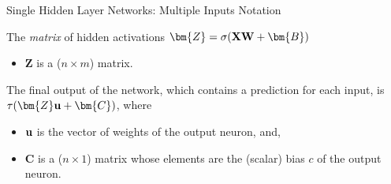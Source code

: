 \documentclass[11pt,compress,t,notes=noshow, xcolor=table]{beamer}
\begin{document}
\begin{framei}[sep=L]{Single Hidden Layer Networks: Multiple Inputs Notation}

\item The \textit{matrix} of hidden activations $\bm{Z} = \sigma(\Xmat\Wmat + \bm{B})$
    \begin{itemize}
      \item $\bm{Z}$ is a ($n \times m$) matrix.
    \end{itemize}
    
    \item The final output of the network, which contains a prediction for each input, is $\tau(\bm{Z}\wtu + \bm{C})$, where
      \begin{itemize}

        \item $\mathbf{u}$ is the vector of weights of the output neuron, and,

        \item $\bm{C}$ is a ($n \times 1$) matrix whose elements are the (scalar) bias $c$ of the output neuron.
      \end{itemize}

\end{framei}
\endlecture
\end{document}
